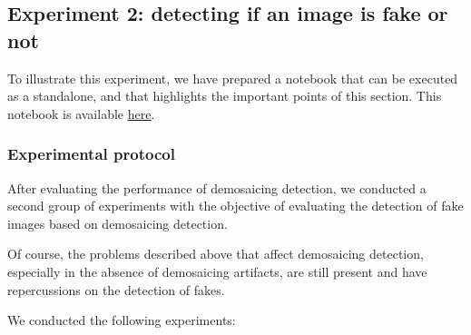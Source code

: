 \documentclass[sigconf, nonacm]{acmart}
\begin{document}
\subsection{Experiment 2: detecting if an image is fake or not} \label{sec:experiment_2}

To illustrate this experiment, we have prepared a notebook that can be executed as a standalone, and that highlights the important points of this section. This notebook is available \href{https://github.com/DentanJeremie/demosaicing-detection/blob/main/doc/forgery_detection_demonstration.ipynb}{\underline{here}}.

\subsubsection{Experimental protocol} 

After evaluating the performance of demosaicing detection, we conducted a second group of experiments with the objective of evaluating the detection of fake images based on demosaicing detection.

Of course, the problems described above that affect demosaicing detection, especially in the absence of demosaicing artifacts, are still present and have repercussions on the detection of fakes.

We conducted the following experiments:
\end{document}
